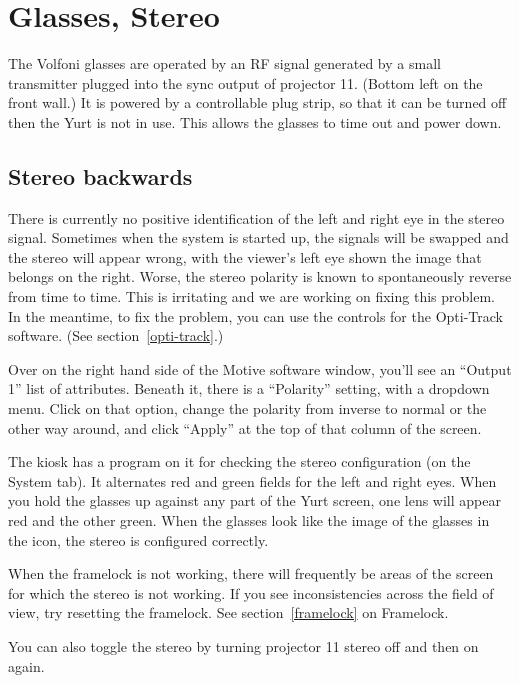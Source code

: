 \documentclass[11pt]{article}
\begin{document}
\section{Glasses, Stereo}

The Volfoni glasses are operated by an RF signal generated by a small
transmitter plugged into the sync output of projector 11.  (Bottom
left on the front wall.)  It is powered by a controllable plug strip,
so that it can be turned off then the Yurt is not in use.  This allows
the glasses to time out and power down.


\subsection{Stereo backwards}

There is currently no positive identification of the left and right
eye in the stereo signal.  Sometimes when the system is started
up, the signals will be swapped and the stereo will appear wrong, with
the viewer's left eye shown the image that belongs on the right.
Worse, the stereo polarity is known to spontaneously reverse from time to
time.  This is irritating and we are working on fixing this problem.
In the meantime, to fix the problem, you can use the controls for the
Opti-Track software.  (See section~\ref{opti-track}.)

Over on the right hand side of the Motive software window, you'll see
an ``Output 1'' list of attributes.  Beneath it, there is a
``Polarity'' setting, with a dropdown menu.  Click on that option,
change the polarity from inverse to normal or the other way around,
and click ``Apply'' at the top of that column of the screen.


The kiosk has a program on it for checking the stereo configuration
(on the System tab).  It alternates red and green fields for the left
and right eyes.  When you hold the glasses up against any part of the
Yurt screen, one lens will appear red and the other green.  When the
glasses look like the image of the glasses in the icon, the stereo is
configured correctly.  

When the framelock is not working, there will frequently be areas of
the screen for which the stereo is not working.  If you see
inconsistencies across the field of view, try resetting the
framelock.  See section~\ref{framelock} on Framelock. 


\iffalse

You can also toggle the stereo by turning projector 11 stereo off and
then on again.
\end{document}
